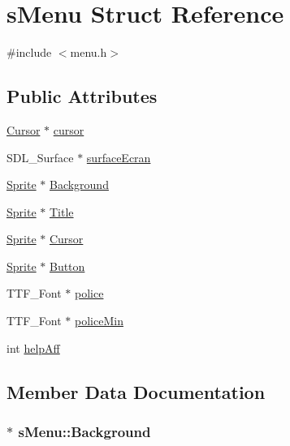 \hypertarget{structs_menu}{}\section{s\+Menu Struct Reference}
\label{structs_menu}


{\ttfamily \#include $<$menu.\+h$>$}

\subsection*{Public Attributes}
\begin{DoxyCompactItemize}
\item 
\hyperlink{interface_8h_a2cc6eac3d76a3bead2da75d8bcd3ef05}{Cursor} $\ast$ \hyperlink{structs_menu_a85643ef7ac4e03b8d740ae93f03c23d2}{cursor}
\item 
S\+D\+L\+\_\+\+Surface $\ast$ \hyperlink{structs_menu_a95c803d0d70319d9adde92ef353b183c}{surface\+Ecran}
\item 
\hyperlink{struct_sprite}{Sprite} $\ast$ \hyperlink{structs_menu_a0124a11c88019763ee2a4ce8498ebc5e}{Background}
\item 
\hyperlink{struct_sprite}{Sprite} $\ast$ \hyperlink{structs_menu_a2551447b30a0bc7136a538f59d537260}{Title}
\item 
\hyperlink{struct_sprite}{Sprite} $\ast$ \hyperlink{structs_menu_adc47799ebb3767570f71ada062542ba1}{Cursor}
\item 
\hyperlink{struct_sprite}{Sprite} $\ast$ \hyperlink{structs_menu_a203f5f3712aa084f7e411dff36a4dc16}{Button}
\item 
T\+T\+F\+\_\+\+Font $\ast$ \hyperlink{structs_menu_a9b0a8085e6305f21d8a4760ad1adcf1e}{police}
\item 
T\+T\+F\+\_\+\+Font $\ast$ \hyperlink{structs_menu_a2cdd8a1ea767c51bf201c34c2973f876}{police\+Min}
\item 
int \hyperlink{structs_menu_a42f4cbc6bb069bd62e88df596cba100a}{help\+Aff}
\end{DoxyCompactItemize}


\subsection{Member Data Documentation}
\hypertarget{structs_menu_a0124a11c88019763ee2a4ce8498ebc5e}{}
\subsubsection[{Background}]{$\ast$ s\+Menu\+::\+Background}\label{structs_menu_a0124a11c88019763ee2a4ce8498ebc5e}
\hypertarget{structs_menu_a203f5f3712aa084f7e411dff36a4dc16}{}
